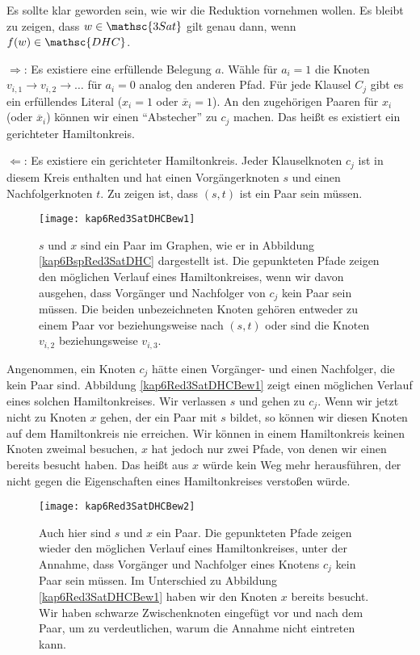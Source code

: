\begin{Bew}
  Es sollte klar geworden sein, wie wir die Reduktion vornehmen wollen. Es bleibt zu zeigen, dass $w \in \mathsc{3Sat}$ gilt genau dann, wenn $f(w) \in \mathsc{DHC}$.

  \glq$\Rightarrow$\grq: Es existiere eine erfüllende Belegung $a$. Wähle für $a_i = 1$ die Knoten $v_{i,1} \rightarrow v_{i,2} \rightarrow \ldots$ für $a_i =0$ analog den anderen Pfad. Für jede Klausel $C_j$ gibt es ein erfüllendes Literal ($x_i = 1$ oder $\overline{x}_i = 1$). An den zugehörigen Paaren für $x_i$ (oder $\overline{x}_i$) können wir einen "`Abstecher"' zu $c_j$ machen. Das heißt es existiert ein gerichteter Hamiltonkreis.

  \glq$\Leftarrow$\grq: Es existiere ein gerichteter Hamiltonkreis. Jeder Klauselknoten $c_j$ ist in diesem Kreis enthalten und hat einen Vorgängerknoten $s$ und einen Nachfolgerknoten $t$. Zu zeigen ist, dass $(s,t)$ ist ein Paar sein müssen.
  
  \begin{figure}[htb]
    \centering
    \texttt{[image: kap6Red3SatDHCBew1]}
    \caption{$s$ und $x$ sind ein Paar im Graphen, wie er in Abbildung \vref{kap6BspRed3SatDHC} dargestellt ist. Die gepunkteten Pfade zeigen den möglichen Verlauf eines Hamiltonkreises, wenn wir davon ausgehen, dass Vorgänger und Nachfolger von $c_j$ kein Paar sein müssen. Die beiden unbezeichneten Knoten gehören entweder zu einem Paar vor beziehungsweise nach $(s,t)$ oder sind die Knoten $v_{i,2}$ beziehungsweise $v_{i,3}$.}
    \label{kap6Red3SatDHCBew1}
  \end{figure}
  
  Angenommen, ein Knoten $c_j$ hätte einen Vorgänger- und einen Nachfolger, die kein Paar sind. Abbildung \vref{kap6Red3SatDHCBew1} zeigt einen möglichen Verlauf eines solchen Hamiltonkreises. Wir verlassen $s$ und gehen zu $c_j$. Wenn wir jetzt nicht zu Knoten $x$ gehen, der ein Paar mit $s$ bildet, so können wir diesen Knoten auf dem Hamiltonkreis nie erreichen. Wir können in einem Hamiltonkreis keinen Knoten zweimal besuchen, $x$ hat jedoch nur zwei Pfade, von denen wir einen bereits besucht haben. Das heißt aus $x$ würde kein Weg mehr herausführen, der nicht gegen die Eigenschaften eines Hamiltonkreises verstoßen würde.

  \begin{figure}[htb]
    \centering
    \texttt{[image: kap6Red3SatDHCBew2]}
    \caption{Auch hier sind $s$ und $x$ ein Paar. Die gepunkteten Pfade zeigen wieder den möglichen Verlauf eines Hamiltonkreises, unter der Annahme, dass Vorgänger und Nachfolger eines Knotens $c_j$ kein Paar sein müssen. Im Unterschied zu Abbildung \vref{kap6Red3SatDHCBew1} haben wir den Knoten $x$ bereits besucht. Wir haben schwarze Zwischenknoten eingefügt vor und nach dem Paar, um zu verdeutlichen, warum die Annahme nicht eintreten kann.}
    \label{kap6Red3SatDHCBew2}
  \end{figure}


\end{Bew}
